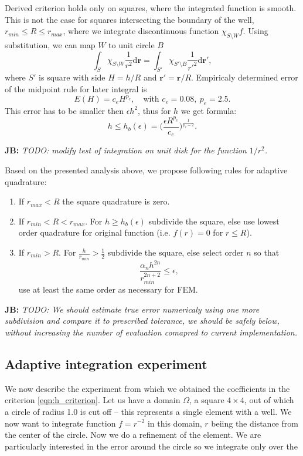 \documentclass[preprint,12pt]{elsarticle}
\def\vc#1{\mathbf{\boldsymbol{#1}}}     %
\def\d{\mathrm{d}}
\newcommand{\noteJB}[1]{{\color{Blue} \textbf{JB: } \textit{#1}}}
\begin{document}
Derived criterion holds only on squares, where the integrated function is smooth.
This is not the case for squares intersecting the boundary of the well, $r_{min} \le R \le r_{max}$, where we integrate 
discontinuous function $\chi_{S \setminus W} f$. Using substitution, we can map $W$ to unit circle $B$
\[
  \int_{S} \chi_{S \setminus W} \frac{1}{r^2} \d \vc r= \int_{S'} \chi_{S' \setminus B} \frac{1}{r'^2} \d \vc {r'},
\]
where $S'$ is square with side $H=h/R$ and $\vc {r'} = \vc{r}/R$. Empiricaly determined error of the midpoint rule for later 
integral is
\[
    E(H) = c_e H^{p_e}, \quad \text{with } c_e=0.08,\ p_e=2.5.
\]
This error has to be smaller then $\epsilon h^2$, thus for $h$ we get formula:
\begin{equation} \label{eqn:h_criterion}
   h\le h_b(\epsilon) = \Big(\frac{\epsilon R^{p_e}}{c_e}\Big)^{\frac{1}{p_e-2}}. 
\end{equation}

\noteJB{TODO: modify test of integration on unit disk for the function $1/r^2$.}

Based on the presented analysis above, we propose following rules for adaptive quadrature:
\begin{enumerate}
 \item If $r_{max} < R$ the square quadrature is zero.
 \item If $r_{min} < R < r_{max}$. For $h \ge h_b(\epsilon)$ subdivide the square, else use lowest order quadrature for 
original function (i.e. $f(r)=0$ for $r\le R$).
 \item If $r_{min} > R$. For $\frac{h}{r_{min}} > \frac{1}{2}$ subdivide the square, else select order $n$ so that 
 \begin{equation} \label{eqn:alpha_criterion}
    \frac{\alpha_n h^{2n}}{r_{min}^{2n+2}} \le \epsilon,
 \end{equation}
 use at least the same order as necessary for FEM.
\end{enumerate}

\noteJB{TODO:
We should estimate true error numericaly using one more subdivision and compare it to prescribed tolerance, we should be safely 
below, without increasing the number of evaluation comapred to current implementation.
}


\subsection{Adaptive integration experiment}
We now describe the experiment from which we obtained the coefficients in the criterion 
\eqref{eqn:h_criterion}. Let us have a domain $\Omega$, a square $4\times4$, out of which a circle of radius 
1.0 is cut off -- this represents a single element with a well. We now want to integrate function 
$f=r^{-2}$ in this domain, $r$ beiing the distance from the center of the circle. Now we do 
a refinement of the element. We are particularly interested in the error around the circle so we integrate only
over the
\end{document}
